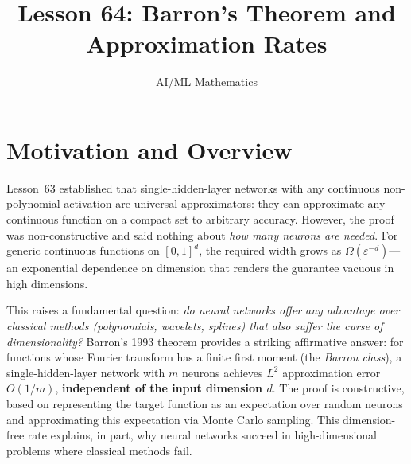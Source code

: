 \documentclass[11pt,a4paper]{article}
\title{Lesson 64: Barron's Theorem and Approximation Rates}
\author{AI/ML Mathematics}
\date{}
\begin{document}
\maketitle
\tableofcontents
\newpage

\section{Motivation and Overview}
\label{sec:motivation}

Lesson~63 established that single-hidden-layer networks with any
continuous non-polynomial activation are universal approximators: they can
approximate any continuous function on a compact set to arbitrary accuracy.
However, the proof was non-constructive and said nothing about \emph{how
many neurons are needed}.  For generic continuous functions on $[0,1]^d$,
the required width grows as $\Omega(\varepsilon^{-d})$---an exponential
dependence on dimension that renders the guarantee vacuous in high
dimensions.

This raises a fundamental question: \emph{do neural networks offer any
advantage over classical methods (polynomials, wavelets, splines) that also
suffer the curse of dimensionality?}  Barron's 1993 theorem provides a
striking affirmative answer: for functions whose Fourier transform has a
finite first moment (the \emph{Barron class}), a single-hidden-layer
network with $m$ neurons achieves $L^2$ approximation error $O(1/m)$,
\textbf{independent of the input dimension $d$}.  The proof is
constructive, based on representing the target function as an expectation
over random neurons and approximating this expectation via Monte Carlo
sampling.  This dimension-free rate explains, in part, why neural networks
succeed in high-dimensional problems where classical methods fail.
\end{document}
